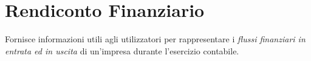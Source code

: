 




\section{Rendiconto Finanziario}

Fornisce informazioni utili agli utilizzatori per rappresentare i 
\emph{flussi finanziari in entrata ed in uscita}
 di un’impresa durante l’esercizio contabile.

